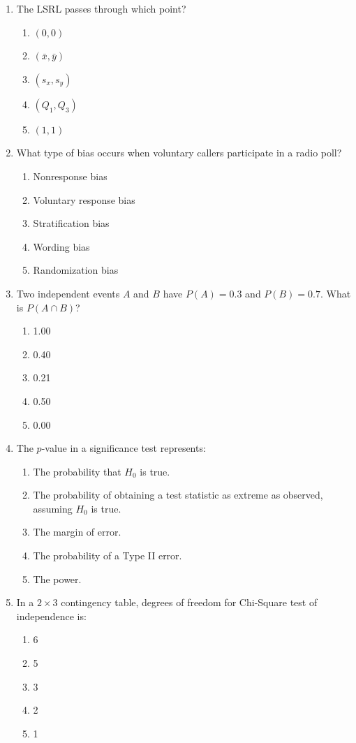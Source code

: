 \begin{enumerate}[resume, leftmargin=1.5em]
  \item The LSRL passes through which point?
  \begin{enumerate}[label=(\Alph*)]
    \item $(0, 0)$ \item $(\bar{x}, \bar{y})$ \item $(s_x, s_y)$ \item $(Q_1, Q_3)$ \item $(1, 1)$
  \end{enumerate}

  \item What type of bias occurs when voluntary callers participate in a radio poll?
  \begin{enumerate}[label=(\Alph*)]
    \item Nonresponse bias \item Voluntary response bias \item Stratification bias \item Wording bias \item Randomization bias
  \end{enumerate}

  \item Two independent events $A$ and $B$ have $P(A) = 0.3$ and $P(B) = 0.7$. What is $P(A \cap B)$?
  \begin{enumerate}[label=(\Alph*)]
    \item 1.00 \item 0.40 \item 0.21 \item 0.50 \item 0.00
  \end{enumerate}

  \item The $p$-value in a significance test represents:
  \begin{enumerate}[label=(\Alph*)]
    \item The probability that $H_0$ is true. \item The probability of obtaining a test statistic as extreme as observed, assuming $H_0$ is true. \item The margin of error. \item The probability of a Type II error. \item The power.
  \end{enumerate}

  \item In a $2 \times 3$ contingency table, degrees of freedom for Chi-Square test of independence is:
  \begin{enumerate}[label=(\Alph*)]
    \item 6 \item 5 \item 3 \item 2 \item 1
  \end{enumerate}
\end{enumerate}

